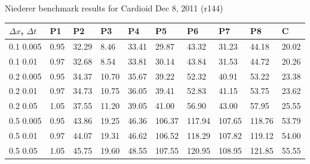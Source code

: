 \documentclass{article}
\begin{document}
\begin{center}
  {\Large  Niederer benchmark results for Cardioid Dec 8, 2011 (r144)\\[20pt]}

  \begin{tabular}{l|lllllllll}
    $\Delta x$, $\Delta t$ & P1 &P2 & P3 & P4 & P5 & P6 & P7 & P8 & C \\
    \hline
    0.1 0.005 &   0.95 &  32.29 &   8.46 &  33.41 &  29.87 &  43.32 &  31.23 &  44.18 &  20.02\\
    \hline
    0.1 0.01 &   0.97 &  32.68 &   8.54 &  33.81 &  30.14 &  43.84 &  31.53 &  44.72 &  20.26\\
    \hline
    0.2 0.005 &   0.95 &  34.37 &  10.70 &  35.67 &  39.22 &  52.32 &  40.91 &  53.22 &  23.38\\
    \hline
    0.2 0.01 &   0.97 &  34.73 &  10.75 &  36.05 &  39.41 &  52.83 &  41.15 &  53.75 &  23.62\\
    \hline
    0.2 0.05 &   1.05 &  37.55 &  11.20 &  39.05 &  41.00 &  56.90 &  43.00 &  57.95 &  25.55\\
    \hline
    0.5 0.005 &   0.95 &  43.86 &  19.25 &  46.36 & 106.37 & 117.94 & 107.65 & 118.76 &  53.79\\
    \hline
    0.5 0.01 &   0.97 &  44.07 &  19.31 &  46.62 & 106.52 & 118.29 & 107.82 & 119.12 &  54.00\\
    \hline
    0.5 0.05 &   1.05 &  45.75 &  19.60 &  48.55 & 107.55 & 120.95 & 108.95 & 121.85 &  55.55\\
    \hline
  \end{tabular}
\end{center}
\end{document}
